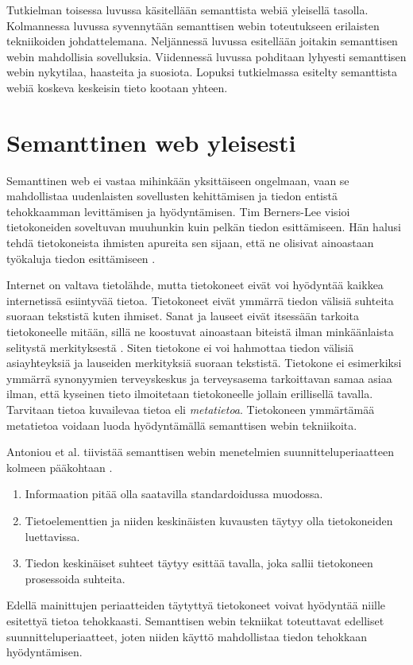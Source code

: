 \documentclass[finnish, 12pt, a4paper, elec, utf8, pdfa, online]{aaltothesis}
\begin{document}
Tutkielman toisessa luvussa käsitellään semanttista webiä yleisellä tasolla. Kolmannessa luvussa syvennytään semanttisen webin toteutukseen erilaisten tekniikoiden johdattelemana. Neljännessä luvussa esitellään joitakin semanttisen webin mahdollisia sovelluksia. Viidennessä luvussa pohditaan lyhyesti semanttisen webin nykytilaa, haasteita ja suosiota. Lopuksi tutkielmassa esitelty semanttista webiä koskeva keskeisin tieto kootaan yhteen.
\clearpage %
\section{Semanttinen web yleisesti}

Semanttinen web ei vastaa mihinkään yksittäiseen ongelmaan, vaan se mahdollistaa uudenlaisten sovellusten kehittämisen ja tiedon entistä tehokkaamman levittämisen ja hyödyntämisen. Tim Berners-Lee visioi tietokoneiden soveltuvan muuhunkin kuin pelkän tiedon esittämiseen. Hän halusi tehdä tietokoneista ihmisten apureita sen sijaan, että ne olisivat ainoastaan työkaluja tiedon esittämiseen \cite{Berners_visio}.

Internet on valtava tietolähde, mutta tietokoneet eivät voi hyödyntää kaikkea internetissä esiintyvää tietoa. Tietokoneet eivät ymmärrä tiedon välisiä suhteita suoraan tekstistä kuten ihmiset. Sanat ja lauseet eivät itsessään tarkoita tietokoneelle mitään, sillä ne koostuvat ainoastaan biteistä ilman minkäänlaista selitystä merkityksestä \cite{ASCII}. Siten tietokone ei voi hahmottaa tiedon välisiä asiayhteyksiä ja lauseiden merkityksiä suoraan tekstistä. Tietokone ei esimerkiksi ymmärrä synonyymien terveyskeskus ja terveysasema tarkoittavan samaa asiaa ilman, että kyseinen tieto ilmoitetaan tietokoneelle jollain erillisellä tavalla. Tarvitaan tietoa kuvailevaa tietoa eli \textit{metatietoa}. Tietokoneen ymmärtämää metatietoa voidaan luoda hyödyntämällä semanttisen webin tekniikoita.

Antoniou et al. tiivistää semanttisen webin menetelmien suunnitteluperiaatteen kolmeen pääkohtaan \cite{Antoniou}.
\vspace{-0.1cm}
\begin{enumerate}
  \item  Informaation pitää olla saatavilla standardoidussa muodossa.
  \item  Tietoelementtien ja niiden keskinäisten kuvausten täytyy olla tietokoneiden luettavissa.
  \item  Tiedon keskinäiset suhteet täytyy esittää tavalla, joka sallii tietokoneen prosessoida suhteita.
\end{enumerate}
\vspace{-0.1cm}
Edellä mainittujen periaatteiden täytyttyä tietokoneet voivat hyödyntää niille esitettyä tietoa tehokkaasti. Semanttisen webin tekniikat toteuttavat edelliset suunnitteluperiaatteet, joten niiden käyttö mahdollistaa tiedon tehokkaan hyödyntämisen.
\end{document}
